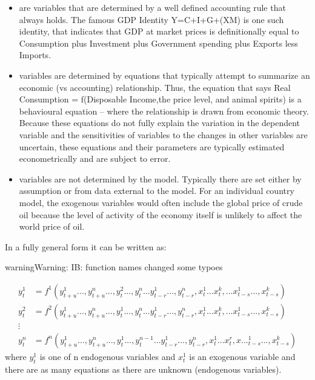 \documentclass[letterpaper,10pt,english]{jupyterBook}
\begin{document}
\sphinxAtStartPar
{}
\begin{itemize}
\item {} 
\sphinxAtStartPar
{} are variables that are determined by a well defined accounting rule that always holds. The famous GDP Identity Y=C+I+G+(X\sphinxhyphen{}M) is one such identity, that indicates that GDP at market prices is definitionally equal to Consumption plus Investment plus Government spending plus Exports less Imports.

\item {} 
\sphinxAtStartPar
{} variables are determined by equations that typically attempt to summarize an economic (vs accounting) relationship. Thus, the equation that says Real Consumption = f(Disposable Income,the price level, and animal spirits) is a behavioural equation – where the relationship is drawn from economic theory. Because these equations do not fully explain the variation in the dependent variable and the sensitivities of variables to the changes in other variables are uncertain, these equations and their parameters are  typically estimated econometrically and are subject to error.

\item {} 
\sphinxAtStartPar
{} variables are not determined by the model. Typically there are set either by assumption or from data external to the model.  For an individual country model, the exogenous variables would often include the global price of crude oil  because the level of activity of the economy itself is unlikely to affect the world price of oil.

\end{itemize}

\sphinxAtStartPar
In a fully general form it can be written as:

\begin{sphinxadmonition}{warning}{Warning:}
\sphinxAtStartPar
IB: function names changed some typoes
\end{sphinxadmonition}
\begin{align*}
y_t^1  &=  f^1(y_{t+u}^1...,y_{t+u}^n...,y_t^2...,y_{t}^n...y_{t-r}^1...,y_{t-r}^n,x_t^1...x_{t}^k,...x_{t-s}^1...,x_{t-s}^k) \\
y_t^2  &=  f^2(y_{t+u}^1...,y_{t+u}^n...,y_t^1...,y_{t}^n...y_{t-r}^1...,y_{t-r}^n,x_t^1...x_{t}^k,...x_{t-s}^1...,x_{t-s}^k) \\
\vdots \\
y_t^n  &=  f^n(y_{t+u}^1...,y_{t+u}^n...,y_t^1...,y_{t}^{n-1}...y_{t-r}^1...,y_{t-r}^n,x_t^1...x_{t}^r,x..._{t-s}^1...,x_{t-s}^k)
\end{align*}
\sphinxAtStartPar
where \( y_t^1 \) is one of n endogenous variables and \(x_t^1\) is an exogenous variable and there are as many equations as there are unknown (endogenous variables).
\end{document}
